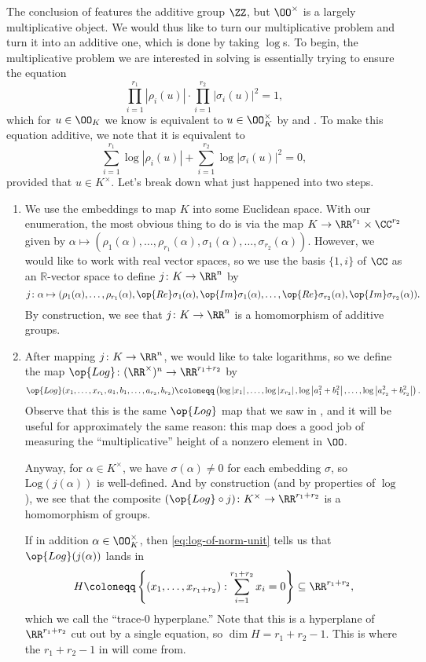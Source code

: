 \documentclass[../notes.tex]{subfiles}
\begin{document}
The conclusion of  features the additive group $\ZZ$, but $\OO^\times$ is a largely multiplicative object. We would thus like to turn our multiplicative problem and turn it into an additive one, which is done by taking $\log$s. To begin, the multiplicative problem we are interested in solving is essentially trying to ensure the equation
\[\prod_{i=1}^{r_1}\left|\rho_i(u)\right|\cdot\prod_{i=1}^{r_2}\left|\sigma_i(u)\right|^2=1,\]
which for $u\in\OO_K$ we know is equivalent to $u\in\OO_K^\times$ by  and . To make this equation additive, we note that it is equivalent to
\begin{equation}
	\sum_{i=1}^{r_1}\log\left|\rho_i(u)\right|+\sum_{i=1}^{r_2}\log\left|\sigma_i(u)\right|^2=0, \label{eq:log-of-norm-unit}
\end{equation}
provided that $u\in K^\times$. Let's break down what just happened into two steps.
\begin{enumerate}
	\item We use the embeddings to map $K$ into some Euclidean space. With our enumeration, the most obvious thing to do is via the map $K\to\RR^{r_1}\times\CC^{r_2}$ given by $\alpha\mapsto(\rho_1(\alpha),\ldots,\rho_{r_1}(\alpha),\sigma_1(\alpha),\ldots,\sigma_{r_2}(\alpha))$. However, we would like to work with real vector spaces, so we use the basis $\{1,i\}$ of $\CC$ as an $\mathbb R$-vector space to define $j\colon K\to\RR^n$ by
	\[j\colon\alpha\mapsto(\rho_1(\alpha),\ldots,\rho_{r_1}(\alpha),\op{Re}\sigma_1(\alpha),\op{Im}\sigma_1(\alpha),\ldots,\op{Re}\sigma_{r_2}(\alpha),\op{Im}\sigma_{r_2}(\alpha)).\]
	By construction, we see that $j\colon K\to\RR^n$ is a homomorphism of additive groups.
	\item After mapping $j\colon K\to\RR^n$, we would like to take logarithms, so we define the map $\op{Log}\colon(\RR^\times)^n\to\RR^{r_1+r_2}$ by
	\[\op{Log}(x_1,\ldots,x_{r_1},a_1,b_1,\ldots,a_{r_2},b_{r_2})\coloneqq\left(\log\left|x_1\right|,\ldots,\log\left|x_{r_2}\right|,\log\left|a_1^2+b_1^2\right|,\ldots,\log\left|a_{r_2}^2+b_{r_2}^2\right|\right).\]
	Observe that this is the same $\op{Log}$ map that we saw in , and it will be useful for approximately the same reason: this map does a good job of measuring the ``multiplicative'' height of a nonzero element in $\OO$.

	Anyway, for $\alpha\in K^\times$, we have $\sigma(\alpha)\ne0$ for each embedding $\sigma$, so $\mathrm{Log}(j(\alpha))$ is well-defined. And by construction (and by properties of $\log$), we see that the composite $({\op{Log}}\circ j)\colon K^\times\to\RR^{r_1+r_2}$ is a homomorphism of groups.
	
	If in addition $\alpha\in\OO_K^\times$, then \eqref{eq:log-of-norm-unit} tells us that $\op{Log}(j(\alpha))$ lands in
	\[H\coloneqq\left\{(x_1,\ldots,x_{r_1+r_2}):\sum_{i=1}^{r_1+r_2}x_i=0\right\}\subseteq\RR^{r_1+r_2},\]
	which we call the ``trace-$0$ hyperplane.'' Note that this is a hyperplane of $\RR^{r_1+r_2}$ cut out by a single equation, so $\dim H=r_1+r_2-1$. This is where the $r_1+r_2-1$ in  will come from.
\end{enumerate}
\end{document}
